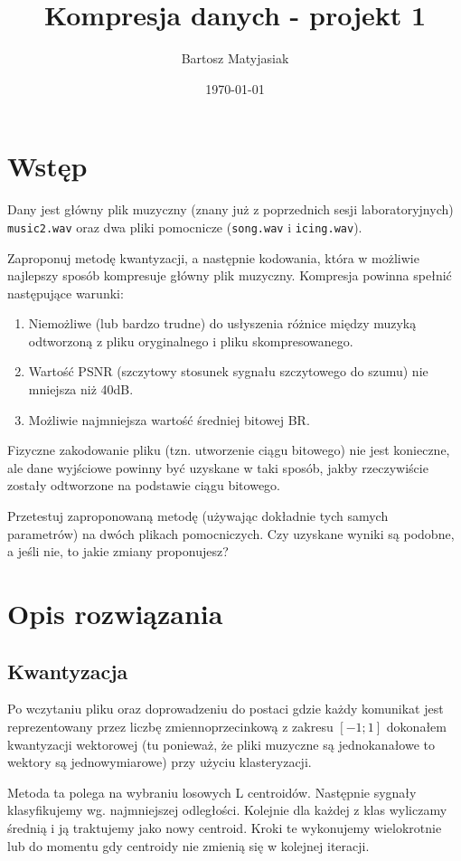 \documentclass[12pt]{article}
\title{Kompresja danych - projekt 1}
\date{\today}
\author{Bartosz Matyjasiak}
\def\code#1{\texttt{#1}}
\begin{document}
\maketitle
\tableofcontents
\pagebreak


\section{Wstęp}
Dany jest główny plik muzyczny (znany już z poprzednich sesji laboratoryjnych)
\code{music2.wav} oraz dwa pliki pomocnicze (\code{song.wav} i \code{icing.wav}).

Zaproponuj metodę kwantyzacji, a następnie kodowania, która w możliwie
najlepszy sposób kompresuje główny plik muzyczny. Kompresja powinna spełnić
następujące warunki:
\begin{enumerate}[I]
  \item Niemożliwe (lub bardzo trudne) do usłyszenia różnice między muzyką odtworzoną z pliku oryginalnego i pliku skompresowanego.
  \item Wartość PSNR (szczytowy stosunek sygnału szczytowego do szumu) nie mniejsza niż 40dB.
  \item Możliwie najmniejsza wartość średniej bitowej BR.
\end{enumerate}

Fizyczne zakodowanie pliku (tzn. utworzenie ciągu bitowego) nie jest konieczne, ale dane wyjściowe powinny być uzyskane w taki sposób, jakby rzeczywiście zostały odtworzone na podstawie ciągu bitowego.

Przetestuj zaproponowaną metodę (używając dokładnie tych samych parametrów) na dwóch plikach pomocniczych. Czy uzyskane wyniki są podobne, a
jeśli nie, to jakie zmiany proponujesz?


\section{Opis rozwiązania}\label{about}
\subsection{Kwantyzacja}
Po wczytaniu pliku oraz doprowadzeniu do postaci gdzie każdy komunikat jest reprezentowany przez liczbę zmiennoprzecinkową z zakresu $[-1;1]$
dokonałem kwantyzacji wektorowej (tu ponieważ, że pliki muzyczne są jednokanałowe to wektory są jednowymiarowe) przy użyciu klasteryzacji.

Metoda ta polega na wybraniu losowych L centroidów. Następnie sygnały klasyfikujemy wg. najmniejszej odległości.
Kolejnie dla każdej z klas wyliczamy średnią i ją traktujemy jako nowy centroid. Kroki te wykonujemy wielokrotnie lub do momentu gdy centroidy nie zmienią się w kolejnej iteracji. 
\end{document}
